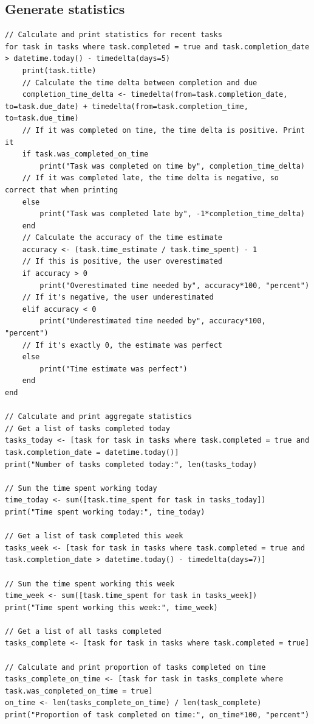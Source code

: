 \documentclass{article}
\begin{document}
\subsection{Generate statistics}
\begin{lstlisting}[breaklines]
// Calculate and print statistics for recent tasks
for task in tasks where task.completed = true and task.completion_date > datetime.today() - timedelta(days=5)
    print(task.title)
    // Calculate the time delta between completion and due
    completion_time_delta <- timedelta(from=task.completion_date, to=task.due_date) + timedelta(from=task.completion_time, to=task.due_time)
    // If it was completed on time, the time delta is positive. Print it
    if task.was_completed_on_time
        print("Task was completed on time by", completion_time_delta)
    // If it was completed late, the time delta is negative, so correct that when printing
    else
        print("Task was completed late by", -1*completion_time_delta)
    end
    // Calculate the accuracy of the time estimate
    accuracy <- (task.time_estimate / task.time_spent) - 1
    // If this is positive, the user overestimated
    if accuracy > 0
        print("Overestimated time needed by", accuracy*100, "percent")
    // If it's negative, the user underestimated
    elif accuracy < 0
        print("Underestimated time needed by", accuracy*100, "percent")
    // If it's exactly 0, the estimate was perfect
    else
        print("Time estimate was perfect")
    end
end

// Calculate and print aggregate statistics
// Get a list of tasks completed today
tasks_today <- [task for task in tasks where task.completed = true and task.completion_date = datetime.today()]
print("Number of tasks completed today:", len(tasks_today)

// Sum the time spent working today
time_today <- sum([task.time_spent for task in tasks_today])
print("Time spent working today:", time_today)

// Get a list of task completed this week
tasks_week <- [task for task in tasks where task.completed = true and task.completion_date > datetime.today() - timedelta(days=7)]

// Sum the time spent working this week
time_week <- sum([task.time_spent for task in tasks_week])
print("Time spent working this week:", time_week)

// Get a list of all tasks completed
tasks_complete <- [task for task in tasks where task.completed = true]

// Calculate and print proportion of tasks completed on time
tasks_complete_on_time <- [task for task in tasks_complete where task.was_completed_on_time = true]
on_time <- len(tasks_complete_on_time) / len(task_complete)
print("Proportion of task completed on time:", on_time*100, "percent")


\end{lstlisting}
\end{document}
